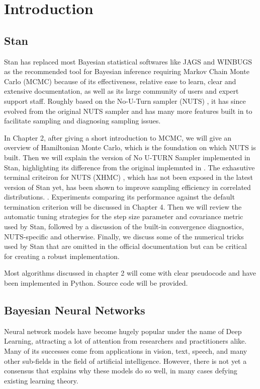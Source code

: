 \documentclass[12pt]{report}
\begin{document}
\chapter{Introduction}
\section{Stan}

Stan has replaced most Bayesian statistical softwares like JAGS and WINBUGS as the recommended tool for Bayesian inference requiring Markov Chain Monte Carlo (MCMC)  because of its effectiveness, relative ease to learn, clear and extensive documentation, as well as its large community of users and expert support staff. Roughly based on the No-U-Turn sampler (NUTS) \cite{hoffman2014no}, it has since evolved from the original NUTS sampler and has many more features built in to facilitate sampling and diagnosing sampling issues.

In Chapter 2, after giving a short introduction to MCMC, we will give an overview of Hamiltonian Monte Carlo, which is the foundation on which NUTS is built. Then we will explain the version of No U-TURN Sampler implemented in Stan, highlighting its difference from the original implemnted in \cite{hoffman2014no}. The exhasutive terminal criteiron for NUTS (XHMC) , which has not been exposed in the latest version of Stan yet, has been shown to improve sampling efficiency in correlated distributions.  \cite{betancourt2016identifying}. Experiments comparing its performance against the default termination criterion will be discussed in Chapter 4. Then we will review the automatic tuning strategies for the step size parameter and covariance metric used by Stan, followed by a discussion of the built-in convergence diagnostics, NUTS-specific and otherwise.
Finally, we discuss some of the numerical tricks used by Stan that are omitted in the official documentation but can be critical for creating a robust implementation. 

Most algorithms discussed in chapter 2 will come with clear pseudocode and have been implemented in Python. Source code will be provided.

\section{Bayesian Neural Networks}

Neural network models have become hugely popular under the name of Deep Learning, attracting a lot of attention from researchers and practitioners alike. Many of its successes come from applications in vision, text, speech, and many other sub-fields in the field of artificial intelligence. However, there is not yet a consensus that explains why these models do so well, in many cases defying existing learning theory. 
\end{document}
